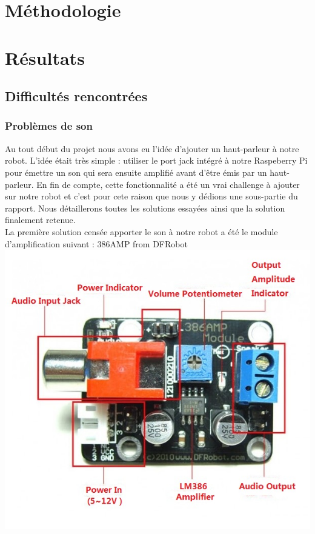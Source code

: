 \documentclass[a4paper, 12pt]{report}
\begin{document}
\chapter{Méthodologie}
\lipsum[5-6]

\chapter{Résultats}
\lipsum[7-8]
\section{Difficultés rencontrées}
\subsection{Problèmes de son}
Au tout début du projet nous avons eu l'idée d'ajouter un haut-parleur à notre robot. L'idée était très simple : utiliser le port jack intégré à notre Raspeberry Pi pour émettre un son qui sera ensuite amplifié avant d'être émis par un haut-parleur. En fin de compte, cette fonctionnalité a été un vrai challenge à ajouter sur notre robot et c'est pour cete raison que nous y dédions une sous-partie du rapport. Nous détaillerons toutes les solutions essayées ainsi que la solution finalement retenue.
\\
La première solution censée apporter le son à notre robot a été le module d'amplification suivant : 386AMP from DFRobot
\\
\includegraphics[scale=0.5]{386AMP.jpg}
\end{document}
